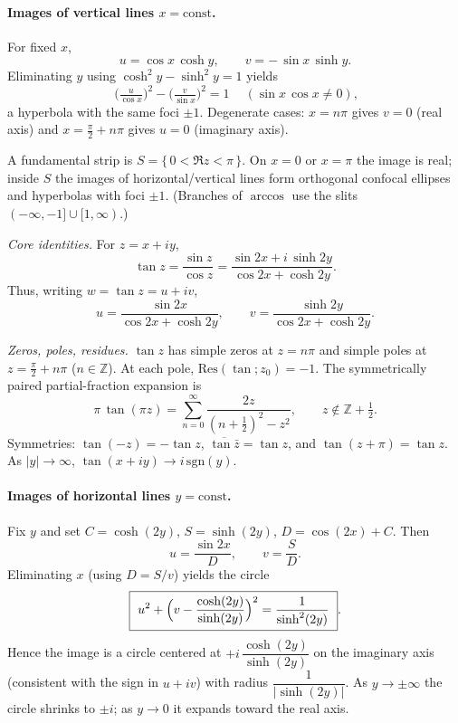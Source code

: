 \begin{problem}[CP-IV-0137]
\medskip
\paragraph{Images of vertical lines $x=\text{const}$.}
For fixed $x$,
\[
u=\cos x\,\cosh y,\qquad v=-\,\sin x\,\sinh y.
\]
Eliminating $y$ using $\cosh^{2}y-\sinh^{2}y=1$ yields
\[
\boxed{\ \Big(\tfrac{u}{\cos x}\Big)^{2}-\Big(\tfrac{v}{\sin x}\Big)^{2}=1\ } \quad
(\sin x\,\cos x\ne0),
\]
a hyperbola with the same foci $\pm1$.
Degenerate cases:
$x=n\pi$ gives $v=0$ (real axis) and $x=\tfrac{\pi}{2}+n\pi$ gives $u=0$ (imaginary axis).

\medskip

A fundamental strip is $S=\{\,0<\Re z<\pi\,\}$. On $x=0$ or $x=\pi$ the image is real; inside $S$ the images of horizontal/vertical lines form orthogonal confocal ellipses and hyperbolas with foci $\pm1$.
(Branches of $\arccos$ use the slits $(-\infty,-1]\cup[1,\infty)$.)

\emph{Core identities.} For $z=x+iy$,
\[
\tan z=\frac{\sin z}{\cos z}
=\frac{\sin 2x + i\,\sinh 2y}{\cos 2x+\cosh 2y}.
\]
Thus, writing $w=\tan z=u+iv$,
\[
u=\frac{\sin 2x}{\cos 2x+\cosh 2y},\qquad
v=\frac{\sinh 2y}{\cos 2x+\cosh 2y}.
\]

\emph{Zeros, poles, residues.}
$\tan z$ has simple zeros at $z=n\pi$ and simple poles at $z=\tfrac{\pi}{2}+n\pi$ ($n\in\mathbb Z$).
At each pole, $\mathrm{Res}(\tan;z_0)=-1$. The symmetrically paired partial-fraction expansion is
\[
\pi\,\tan(\pi z)=\sum_{n=0}^{\infty}\frac{2z}{(n+\tfrac12)^2-z^2},\qquad z\notin\mathbb Z+\tfrac12.
\]
Symmetries: $\tan(-z)=-\tan z$, $\overline{\tan\bar z}=\tan z$, and $\tan(z+\pi)=\tan z$.
As $|y|\to\infty$, $\tan(x+iy)\to i\,\mathrm{sgn}(y)$.

\medskip
\paragraph{Images of horizontal lines $y=\text{const}$.}
Fix $y$ and set $C=\cosh(2y)$, $S=\sinh(2y)$, $D=\cos(2x)+C$. Then
\[
u=\frac{\sin 2x}{D},\qquad v=\frac{S}{D}.
\]
Eliminating $x$ (using $D=S/v$) yields the circle
\[
\boxed{\ u^{2}+\Bigl(v-\frac{\cosh(2y)}{\sinh(2y)}\Bigr)^{2}=\frac{1}{\sinh^{2}(2y)}\ }.
\]
Hence the image is a circle centered at $+i\,\dfrac{\cosh(2y)}{\sinh(2y)}$ on the imaginary axis (consistent with the sign in $u+iv$) with radius $\dfrac{1}{|\sinh(2y)|}$.
As $y\to\pm\infty$ the circle shrinks to $\pm i$; as $y\to0$ it expands toward the real axis.


\end{problem}
